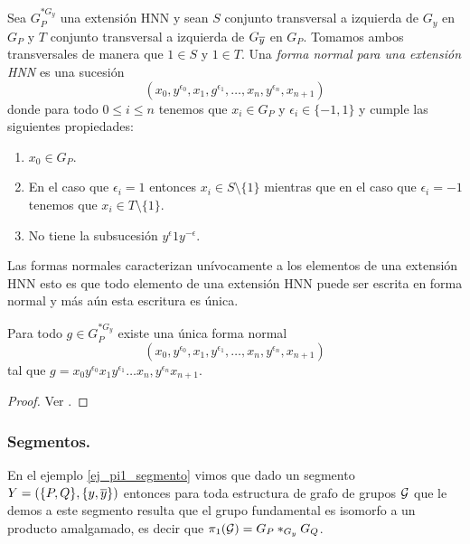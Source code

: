 \documentclass[tesis.tex]{subfiles}
\begin{document}


\begin{deff}
	Sea $G_P^{\ast G_y}$ una extensión HNN  y sean $S$ conjunto transversal a izquierda de $G_y$ en $G_P$ y $T$ conjunto transversal a izquierda de $G_{\overline y}$ en $G_P$. 
	Tomamos ambos transversales de manera que $1 \in S$ y $1 \in T$.
	Una \emph{forma normal para una extensión HNN} es una sucesión
	\[
	(x_{0},y^{\epsilon_0},x_{1},g^{\epsilon_1}, \dots, x_{n},y^{\epsilon_n},x_{n+1})
	\]
	donde para todo $0 \le i \le n$ tenemos que $x_{i} \in G_{P}$ y $\epsilon_{i} \in \{ -1,1 \}$ y cumple las siguientes propiedades:
	\begin{enumerate}
		\item $x_0 \in G_P$.
		\item En el caso que $\epsilon_{i} = 1$ entonces $x_i \in S \setminus \{ 1\}$ mientras que en el caso que $\epsilon_{i} = -1$ tenemos que $x_{i} \in T \setminus \{ 1 \}$.
		\item No tiene la subsucesión $y^{\epsilon}1y^{-\epsilon}$.
	\end{enumerate}
\end{deff}

Las formas normales caracterizan unívocamente a los elementos de una extensión HNN esto es que todo elemento de una extensión HNN puede ser escrita en forma normal y más aún esta escritura es única.
 
\begin{teo}
	Para todo $g \in G_P^{\ast G_y}$ existe una única forma normal 
	\[
	(x_{0},y^{\epsilon_0},x_{1},y^{\epsilon_1}, \dots, x_{n},y^{\epsilon_n},x_{n+1})
	\]
	tal que $g = x_{0}y^{\epsilon_0}x_{1}y^{\epsilon_1} \dots x_{n},y^{\epsilon_n}x_{n+1}$.
\end{teo}
\begin{proof}
	Ver \cite[p.182]{lyndon1977combinatorial}.
\end{proof}


\subsubsection{Segmentos.}\label{subsub_segmento}

En el ejemplo \ref{ej_pi1_segmento} vimos que dado un segmento $Y = (\{P,Q\}, \{y, \overline y\}  )$ entonces para toda estructura de grafo de grupos ${\cal G}$ que le demos a este segmento
resulta que el grupo fundamental es isomorfo a un producto amalgamado, es decir que $\pi_1({\cal G}) = G_P \ast_{G_y} G_Q$. 
\end{document}
